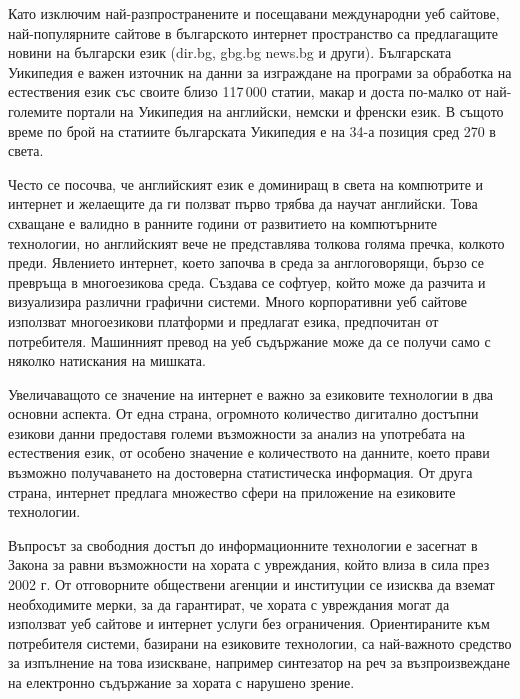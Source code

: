 \documentclass[]{../../metanetpaper}
\begin{document}
\begin{multicols}{2}
Като изключим най-разпространените и посещавани международни уеб сайтове, най-популярните сайтове в българското интернет пространство са предлагащите новини на български език (dir.bg, gbg.bg news.bg и други). Българската Уикипедия е важен източник на данни за изграждане на програми за обработка на естествения език със своите близо 117\,000 статии, макар и доста по-малко от най-големите портали на Уикипедия на английски, немски и френски език. В същото време по брой на статиите българската Уикипедия е на 34-а \cite{metadata} позиция сред 270 в света. 

Често се посочва, че английският език е доминиращ в света на компютрите и интернет и желаещите да ги ползват първо трябва да научат английски. Това схващане е валидно в ранните години от развитието на компютърните технологии, но английският вече не представлява толкова голяма пречка, колкото преди. Явлението интернет, което започва в среда за англоговорящи, бързо се превръща в многоезикова среда. Създава се софтуер, който може да разчита и визуализира различни графични системи. Много корпоративни уеб сайтове използват многоезикови платформи и предлагат езика, предпочитан от потребителя. Машинният превод на уеб съдържание може да се получи само с няколко натискания на мишката.


Увеличаващото се значение на интернет е важно за езиковите технологии в два основни аспекта. От една страна, огромното количество дигитално достъпни езикови данни предоставя големи възможности за анализ на употребата на естествения език, от особено значение е количеството на данните, което прави възможно получаването на достоверна статистическа информация. От друга страна, интернет предлага множество сфери на приложение на езиковите технологии. 

Въпросът за свободния достъп до информационните технологии е засегнат в Закона за равни възможности на хората с увреждания, който влиза в сила през 2002 г. От отговорните обществени агенции и институции се изисква да вземат необходимите мерки, за да гарантират, че хората с увреждания могат да използват уеб сайтове и интернет услуги без ограничения. Ориентираните към потребителя системи, базирани на езиковите технологии, са най-важното средство за изпълнение на това изискване, например синтезатор на реч за възпроизвеждане  на електронно съдържание за хората с нарушено зрение.


\end{multicols}
\end{document}
